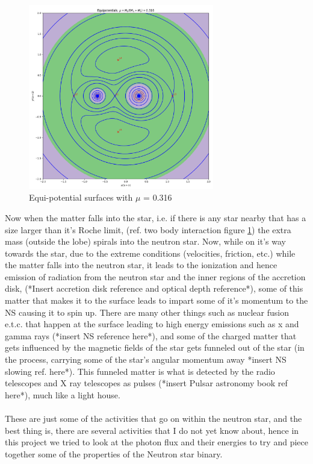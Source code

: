 \documentclass[a4paper,twoside]{report}
\numberwithin{equation}{section}
\begin{document}
\paragraph{}
\begin{figure}
\includegraphics[width=1.0\linewidth, height=8.1cm]{equipotentials_mu_0316.png}
\caption{Equi-potential surfaces with $\mu$ = 0.316}
\label{Star Evolution Diagram}
\end{figure}
Now when the matter falls into the star, i.e. if there is any star nearby that has a size larger than it's Roche limit, (ref. two body interaction figure \ref{Star Evolution Diagram}) the extra mass (outside the lobe) spirals into the neutron star. Now, while on it's way towards the star, due to the extreme conditions (velocities, friction, etc.) while the matter falls into the neutron star, it leads to the ionization and hence emission of radiation from the neutron star and the inner regions of the accretion disk, (*Insert accretion disk reference and optical depth reference*), some of this matter that makes it to the surface leads to impart some of it's momentum to the NS causing it to spin up. There are many other things such as nuclear fusion e.t.c. that happen at the surface leading to high energy emissions such as x and gamma rays (*insert NS reference here*), and some of the charged matter that gets influenced by the magnetic fields of the star gets funneled out of the star (in the process, carrying some of the star's angular momentum away *insert NS slowing ref. here*). This funneled matter is what is detected by the radio telescopes and X ray telescopes as pulses (*insert Pulsar astronomy book ref here*), much like a light house. 
\paragraph{}
These are just some of the activities that go on within the neutron star, and the best thing is, there are several activities that I do not yet know about, hence in this project we tried to look at the photon flux and their energies to try and piece together some of the properties of the Neutron star binary. 
\end{document}
